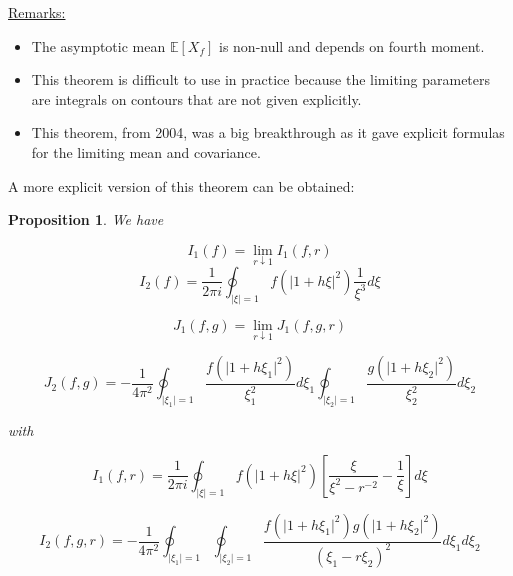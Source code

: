 \documentclass[twoside]{article}
\newtheorem{proposition}[theorem]{Proposition}
\begin{document}
\underline{Remarks:} \begin{itemize}
	\item The asymptotic mean $\mathbb{E}[X_f]$ is non-null and depends on fourth moment.
	\item This theorem is difficult to use in practice because the limiting parameters are integrals on contours that are not given explicitly.
	\item This theorem, from 2004, was a big breakthrough as it gave explicit formulas for the limiting mean and covariance.
\end{itemize}

A more explicit version of this theorem can be obtained:

\begin{proposition}
	We have
	
	$$I_1(f)=\lim_{r \downarrow 1}I_1(f,r)$$
	$$I_2(f)=\frac{1}{2\pi i}\oint_{\lvert\xi\rvert =1}f(\lvert1+h\xi\rvert^2)\frac{1}{\xi^3}d\xi$$
	
	$$J_1(f,g)=\lim_{r\downarrow 1}J_1(f,g,r)$$
	
	$$J_2(f,g)=-\frac{1}{4\pi^2}\oint_{\lvert\xi_1\rvert =1}\frac{f(\lvert 1+h\xi_1\rvert^2)}{\xi_1^2}d\xi_1\oint_{\lvert\xi_2\rvert =1}\frac{g(\lvert 1+h\xi_2\rvert ^2)}{\xi_2^2}d\xi_2$$
	
	with 
	
	$$I_1(f,r)=\frac{1}{2\pi i}\oint_{\lvert \xi\rvert=1}f(\lvert 1+ h\xi\rvert^2)\left[\frac{\xi}{\xi^2-r^{-2}}-\frac{1}{\xi}\right]d\xi$$
	
	$$I_2(f,g,r)=-\frac{1}{4\pi^2}\oint_{\lvert \xi_1\rvert =1}\oint_{\lvert \xi_2\rvert =1}\frac{f(\lvert 1+h\xi_1\rvert ^2)g(\lvert 1+h\xi_2\rvert ^2)}{(\xi_1-r\xi_2)^2}d\xi_1d\xi_2$$
\end{proposition}
\end{document}
